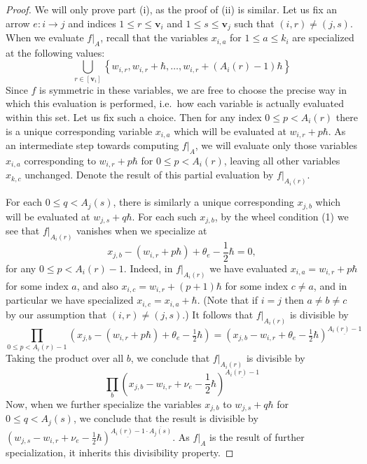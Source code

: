 \documentclass[11pt,reqno]{amsart}
\renewcommand{\mathbf}{\mathbold}
\numberwithin{equation}{section}
\theoremstyle{definition}
\newcommand{\bv}{\mathbf{v}}
\renewcommand{\bv}{\mathbf{v}} %
\begin{document}
\begin{proof}
We will only prove part (i), as the proof of (ii) is similar.  Let us fix an arrow  $e: i \rightarrow j$ and indices $1 \leq r \leq \bv_i$ and $1 \leq s\leq \bv_j$ such that $(i,r) \neq (j,s)$.   When we evaluate $f|_A$, recall that the variables $x_{i,a} $  for $1 \leq a \leq k_i$ are specialized at the following values:
$$
\bigcup_{r \in [\bv_i]} \left\{ w_{i,r}, w_{i,r}+ \hbar, \ldots, w_{i,r} + ( A_i(r) -1) \hbar \right\}
$$
Since $f$ is symmetric in these variables, we are free to choose the precise way in which this evaluation is performed, i.e.~how each variable is actually evaluated within this set.  Let us fix such a choice.  Then for any index $0 \leq p < A_i(r)$  there is a unique corresponding variable $x_{i,a}$ which will be evaluated at $w_{i,r}+p\hbar$.   
As an intermediate step towards computing $f|_A$, we will evaluate only those variables $x_{i,a}$ corresponding to $w_{i,r} + p \hbar$ for $ 0 \leq p < A_i(r)$, leaving all other variables $x_{k,c}$ unchanged. Denote the result of this partial evaluation by $f|_{A_i(r)}$.

For each $0\leq q < A_j(s)$, there is similarly a unique corresponding $x_{j,b}$ which will be evaluated at $w_{j,s} + q \hbar$.   For each such $x_{j,b}$, by the wheel condition (1) we see that $f|_{A_i(r)}$ vanishes when we specialize at 
\begin{equation}
\label{eq: divisible 1}
x_{j,b} - (w_{i,r}+ p \hbar) + \theta_e - \frac{1}{2} \hbar = 0,
\end{equation}
for any $0 \leq p < A_i(r) - 1$. Indeed, in $f|_{A_i(r)}$ we have evaluated $x_{i,a} = w_{i,r}+ p \hbar$ for some index $a$, and also $x_{i,c} = w_{i,r} + (p+1)\hbar$ for some index $c \neq a$, and in particular we have specialized $x_{i,c} = x_{i,a} + \hbar$.  (Note that if $i= j$ then $a\neq b \neq c$ by our assumption that $(i,r) \neq (j,s)$.) It follows that $f|_{A_i(r)}$ is divisible by
$$
\prod_{0 \leq p < A_i(r)-1} (x_{j,b} - (w_{i,r}+p\hbar) + \theta_e - \tfrac{1}{2}\hbar) = (x_{j,b} - w_{i,r} + \theta_e - \tfrac{1}{2} \hbar)^{\underline{A_i(r)-1}}
$$
Taking the product over all $b$, we conclude that $f|_{A_i(r)}$ is divisible by
\begin{equation}
\label{eq: divisible 2}
\prod_b (x_{j,b} - w_{i,r} + \nu_e - \frac{1}{2}\hbar)^{\underline{A_i(r)-1}}
\end{equation}
Now, when we further specialize the variables $x_{j,b}$ to $w_{j,s}+ q \hbar $ for $ 0 \leq q < A_j(s)$, we conclude that the result is divisible by $(w_{j,s} - w_{i,r} + \nu_e - \frac{1}{2}\hbar)^{\underline{A_i(r) - 1} \cdot \overline{A_j(s)}}$.  As $f|_A$ is the result of further specialization, it inherits this divisibility property.
\end{proof}
\end{document}
